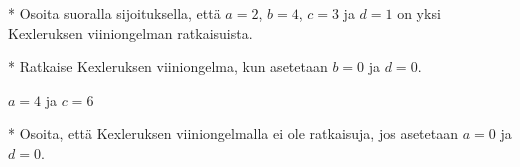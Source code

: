 \begin{kotitehtavasivu}
\begin{tehtava}
\end{tehtava}

\begin{tehtava} %
    * Osoita suoralla sijoituksella, että $a=2$, $b=4$, $c=3$ ja $d=1$ on yksi Kexleruksen viiniongelman ratkaisuista.
\end{tehtava}

\begin{tehtava} %
    * Ratkaise Kexleruksen viiniongelma, kun asetetaan $b=0$ ja $d=0$.

    \begin{vastaus}
        $a = 4$ ja $c = 6$
    \end{vastaus}
    
\end{tehtava}

\begin{tehtava} %
    * Osoita, että Kexleruksen viiniongelmalla ei ole ratkaisuja, jos asetetaan $a=0$ ja $d=0$.
\end{tehtava}

\end{kotitehtavasivu}
